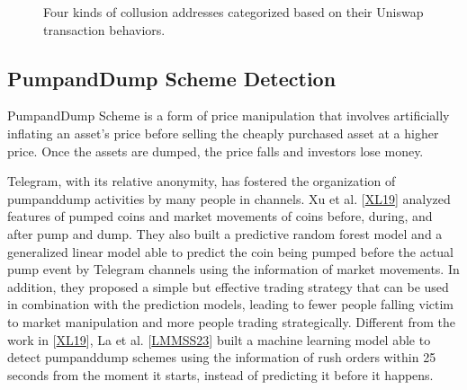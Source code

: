 \documentclass[letterpaper,10pt,english]{jupyterBook}
\begin{document}
\begin{figure}[htbp]
\centering
\capstart

\noindent{}
\caption{Four kinds of collusion addresses categorized based on their Uniswap transaction behaviors.}\label{\detokenize{SDE/ScamDetec:collusion-address}}\end{figure}


\subsection{Pump\sphinxhyphen{}and\sphinxhyphen{}Dump Scheme Detection}
\label{\detokenize{SDE/ScamDetec:pump-and-dump-scheme-detection}}
\begin{sphinxShadowBox}

\sphinxAtStartPar
Pump\sphinxhyphen{}and\sphinxhyphen{}Dump Scheme is a form of price manipulation that involves artificially inflating an asset’s price before selling the cheaply purchased asset at a higher price. Once the assets are dumped, the price falls and investors lose money.
\end{sphinxShadowBox}

\sphinxAtStartPar
Telegram, with its relative anonymity, has fostered the organization of pump\sphinxhyphen{}and\sphinxhyphen{}dump activities by many people in channels. Xu et al. {[}\hyperlink{cite.SDE/ScamDetec:id143}{XL19}{]} analyzed features of pumped coins and market movements of coins before, during, and after pump and dump. They also built a predictive random forest model and a generalized linear model able to predict the coin being pumped before the actual pump event by Telegram channels using the information of market movements. In addition, they proposed a simple but effective trading strategy that can be used in combination with the prediction models, leading to fewer people falling victim to market manipulation and more people trading strategically. Different from the work in {[}\hyperlink{cite.SDE/ScamDetec:id143}{XL19}{]}, La et al. {[}\hyperlink{cite.SDE/ScamDetec:id142}{LMMSS23}{]} built a machine learning model able to detect pump\sphinxhyphen{}and\sphinxhyphen{}dump schemes using the information of rush orders within 25 seconds from the moment it starts, instead of predicting it before it happens.
\end{document}
